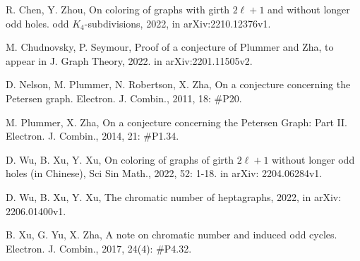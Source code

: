 \documentclass[11pt]{article}
\begin{document}
\begin{thebibliography}{}
 R. Chen, Y. Zhou, On coloring of graphs with girth $2\ell+1$ and without longer odd holes. odd $K_4$-subdivisions, 2022, in arXiv:2210.12376v1.

 M. Chudnovsky, P. Seymour, Proof of a conjecture of Plummer and Zha, to appear in J. Graph Theory, 2022. in arXiv:2201.11505v2.
		
		
 D. Nelson, M. Plummer, N. Robertson, X. Zha, On a conjecture concerning the Petersen graph. Electron. J. Combin., 2011, 18: \#P20.
		
 M. Plummer, X. Zha, On a conjecture concerning the Petersen Graph: Part II. Electron. J. Combin., 2014, 21: \#P1.34.
		
		
 D. Wu, B. Xu, Y. Xu, On coloring of graphs of girth $2\ell+1$ without longer odd holes (in Chinese), Sci Sin Math., 2022, 52: 1-18.  in arXiv: 2204.06284v1.
		
 D. Wu, B. Xu, Y. Xu, The chromatic number of heptagraphs, 2022, in arXiv: 2206.01400v1.
		
 B. Xu, G. Yu, X. Zha, A note on chromatic number and induced odd cycles. Electron. J. Combin., 2017, 24(4): \#P4.32.







\end{thebibliography}
\end{document}
